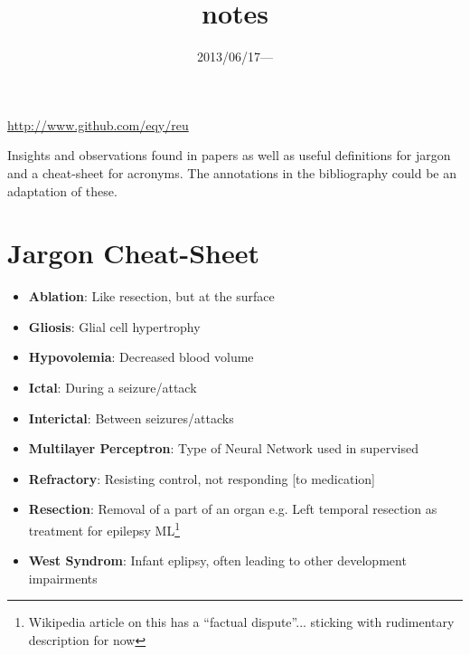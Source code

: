\documentclass{article}
\title{\vspace{-3ex}notes}
\date{2013/06/17---}
\begin{document}
\maketitle
\url{http://www.github.com/eqy/reu}

Insights and observations found in papers as well as useful definitions for
jargon and a cheat-sheet for acronyms. The annotations in the bibliography could
be an adaptation of these.

\section{Jargon Cheat-Sheet}
\begin{itemize}
\item \textbf{Ablation}: Like resection, but at the surface
\item \textbf{Gliosis}: Glial cell hypertrophy
\item \textbf{Hypovolemia}: Decreased blood volume
\item \textbf{Ictal}: During a seizure/attack
\item \textbf{Interictal}: Between seizures/attacks
\item \textbf{Multilayer Perceptron}: Type of Neural Network used in supervised
\item \textbf{Refractory}: Resisting control, not responding [to medication] 
\item \textbf{Resection}: Removal of a part of an organ e.g. Left temporal
resection as treatment for epilepsy
ML\footnote{Wikipedia article on this has a ``factual dispute''... sticking with
rudimentary description for now}
\item \textbf{West Syndrom}: Infant eplipsy, often leading to other development
impairments
\end{itemize}
\end{document}
